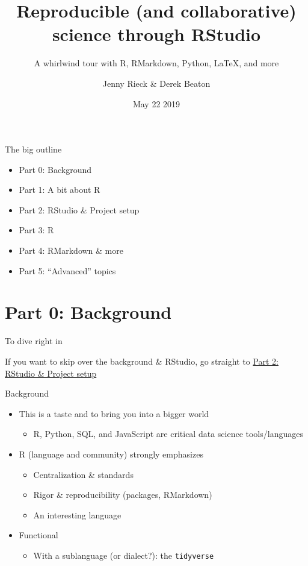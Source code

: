 \documentclass[
  ignorenonframetext,
]{beamer}
\title{Reproducible (and collaborative) science through RStudio}
\subtitle{A whirlwind tour with R, RMarkdown, Python, LaTeX, and more}
\author{Jenny Rieck \& Derek Beaton}
\date{May 22 2019}
\providecommand{\tightlist}{%
  \setlength{\itemsep}{0pt}\setlength{\parskip}{0pt}}
\begin{document}
\frame{\titlepage}

\begin{frame}{The big outline}
\protect\hypertarget{the-big-outline}{}

\begin{itemize}
\tightlist
\item
  Part 0: Background
\item
  Part 1: A bit about R
\item
  Part 2: RStudio \& Project setup
\item
  Part 3: R
\item
  Part 4: RMarkdown \& more
\item
  Part 5: ``Advanced'' topics
\end{itemize}

\end{frame}

\hypertarget{part-0-background}{%
\section{Part 0: Background}\label{part-0-background}}

\begin{frame}{To dive right in}
\protect\hypertarget{to-dive-right-in}{}

If you want to skip over the background \& RStudio, go straight to
\protect\hyperlink{part-2-rstudio-project-setup}{Part 2: RStudio \&
Project setup}

\end{frame}

\begin{frame}[fragile]{Background}
\protect\hypertarget{background}{}

\begin{itemize}
\tightlist
\item
  This is a taste and to bring you into a bigger world

  \begin{itemize}
  \tightlist
  \item
    R, Python, SQL, and JavaScript are critical data science
    tools/languages
  \end{itemize}
\item
  R (language and community) strongly emphasizes

  \begin{itemize}
  \tightlist
  \item
    Centralization \& standards
  \item
    Rigor \& reproducibility (packages, RMarkdown)
  \item
    An interesting language
  \end{itemize}
\item
  Functional

  \begin{itemize}
  \tightlist
  \item
    With a sublanguage (or dialect?): the \texttt{tidyverse}
  \end{itemize}
\end{itemize}

\end{frame}
\end{document}
